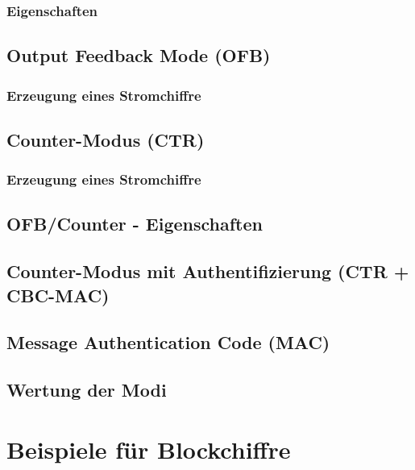 \subsubsection*{Eigenschaften}

\subsection{Output Feedback Mode (OFB)}
\subsubsection*{Erzeugung eines Stromchiffre}

\subsection{Counter-Modus (CTR)}
\subsubsection*{Erzeugung eines Stromchiffre}

\subsection{OFB/Counter - Eigenschaften}

\subsection{Counter-Modus mit Authentifizierung (CTR + CBC-MAC)}

\subsection{Message Authentication Code (MAC)}

\subsection{Wertung der Modi}

\section{Beispiele für Blockchiffre}

